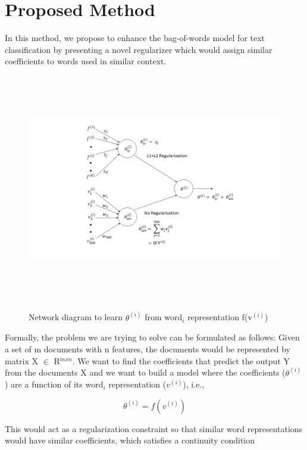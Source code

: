 \section{Proposed Method}

In this method, we propose to enhance the bag-of-words model for text classification by presenting a novel regularizer which would assign similar coefficients to words used in similar context.

\begin{figure}
\centering
\includegraphics[width=18cm, height=10cm]{images/Fig3.jpg}\\
\centering
\caption{Network diagram to learn $\theta^{(i)}$ from word$_{i}$ representation f(v$^{(i)}$)}
\label{fig:foo}
\end{figure}

Formally, the problem we are trying to solve can be formulated as follows: Given a set of m documents with n features, the documents would be represented by matrix X $\in$ R$^{m x n}$. We want to find the coefficients that predict the output Y from the documents X and we want to build a model where the coefficients ($\theta^{(i)}$) are a function of its word$_{i}$ representation ($v^{(i)}$), i.e.,

\begin{equation}\label{lb1}
\theta^{(i)} = f(v^{(i)})
\end{equation}

This would act as a regularization constraint so that similar word representations would have similar coefficients, which satisfies a continuity condition

